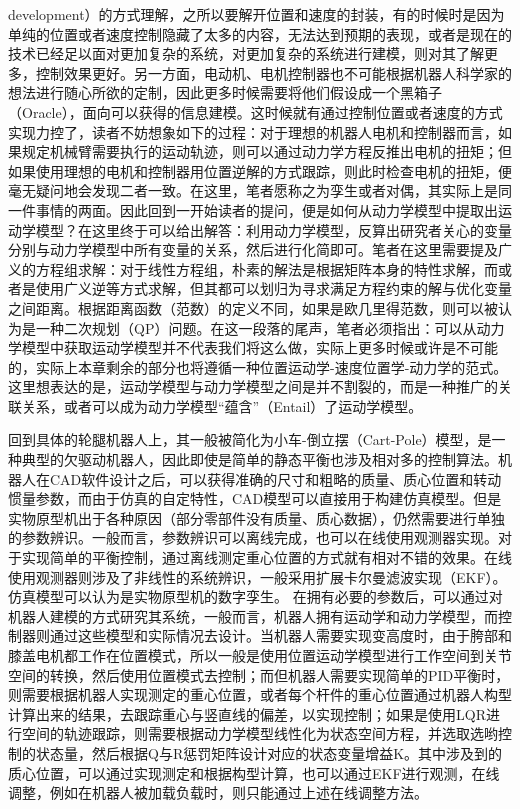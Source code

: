 development）的方式理解，之所以要解开位置和速度的封装，有的时候时是因为单纯的位置或者速度控制隐藏了太多的内容，无法达到预期的表现，或者是现在的技术已经足以面对更加复杂的系统，对更加复杂的系统进行建模，则对其了解更多，控制效果更好。另一方面，电动机、电机控制器也不可能根据机器人科学家的想法进行随心所欲的定制，因此更多时候需要将他们假设成一个黑箱子（Oracle），面向可以获得的信息建模。这时候就有通过控制位置或者速度的方式实现力控了，读者不妨想象如下的过程：对于理想的机器人电机和控制器而言，如果规定机械臂需要执行的运动轨迹，则可以通过动力学方程反推出电机的扭矩；但如果使用理想的电机和控制器用位置逆解的方式跟踪，则此时检查电机的扭矩，便毫无疑问地会发现二者一致。在这里，笔者愿称之为孪生或者对偶，其实际上是同一件事情的两面。因此回到一开始读者的提问，便是如何从动力学模型中提取出运动学模型？在这里终于可以给出解答：利用动力学模型，反算出研究者关心的变量分别与动力学模型中所有变量的关系，然后进行化简即可。笔者在这里需要提及广义的方程组求解：对于线性方程组，朴素的解法是根据矩阵本身的特性求解，而或者是使用广义逆等方式求解，但其都可以划归为寻求满足方程约束的解与优化变量之间距离。根据距离函数（范数）的定义不同，如果是欧几里得范数，则可以被认为是一种二次规划（QP）问题。在这一段落的尾声，笔者必须指出：可以从动力学模型中获取运动学模型并不代表我们将这么做，实际上更多时候或许是不可能的，实际上本章剩余的部分也将遵循一种位置运动学-速度位置学-动力学的范式。这里想表达的是，运动学模型与动力学模型之间是并不割裂的，而是一种推广的关联关系，或者可以成为动力学模型“蕴含”（Entail）了运动学模型。

回到具体的轮腿机器人上，其一般被简化为小车-倒立摆（Cart-Pole）模型，是一种典型的欠驱动机器人，因此即使是简单的静态平衡也涉及相对多的控制算法。机器人在CAD软件设计之后，可以获得准确的尺寸和粗略的质量、质心位置和转动惯量参数，而由于仿真的自定特性，CAD模型可以直接用于构建仿真模型。但是实物原型机出于各种原因（部分零部件没有质量、质心数据），仍然需要进行单独的参数辨识。一般而言，参数辨识可以离线完成，也可以在线使用观测器实现。对于实现简单的平衡控制，通过离线测定重心位置的方式就有相对不错的效果。在线使用观测器则涉及了非线性的系统辨识，一般采用扩展卡尔曼滤波实现（EKF）。仿真模型可以认为是实物原型机的数字孪生。
在拥有必要的参数后，可以通过对机器人建模的方式研究其系统，一般而言，机器人拥有运动学和动力学模型，而控制器则通过这些模型和实际情况去设计。当机器人需要实现变高度时，由于胯部和膝盖电机都工作在位置模式，所以一般是使用位置运动学模型进行工作空间到关节空间的转换，然后使用位置模式去控制；而但机器人需要实现简单的PID平衡时，则需要根据机器人实现测定的重心位置，或者每个杆件的重心位置通过机器人构型计算出来的结果，去跟踪重心与竖直线的偏差，以实现控制；如果是使用LQR进行空间的轨迹跟踪，则需要根据动力学模型线性化为状态空间方程，并选取选哟控制的状态量，然后根据Q与R惩罚矩阵设计对应的状态变量增益K。其中涉及到的质心位置，可以通过实现测定和根据构型计算，也可以通过EKF进行观测，在线调整，例如在机器人被加载负载时，则只能通过上述在线调整方法。

